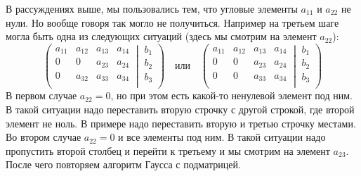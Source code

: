 В рассуждениях выше, мы пользовались тем, что угловые элементы $a_{11}$ и $a_{22}$ не нули.
Но вообще говоря так могло не получиться.
Например на третьем шаге могла быть одна из следующих ситуаций (здесь мы смотрим на элемент $a_{22}$):
\[
\left(\left.
\begin{matrix}
a_{11}& a_{12}&a_{13}& a_{14}\\
0&0&a_{23}& a_{24}\\
0& a_{32}&a_{33}& a_{34}\\
\end{matrix}
\:\right|\:
\begin{matrix}
b_1\\
b_2\\
b_3\\
\end{matrix}
\right)
\quad\text{или}\quad
\left(\left.
\begin{matrix}
a_{11}& a_{12}&a_{13}& a_{14}\\
0& 0&a_{23}& a_{24}\\
0& 0&a_{33}& a_{34}\\
\end{matrix}
\:\right|\:
\begin{matrix}
b_1\\
b_2\\
b_3\\
\end{matrix}
\right)
\]
В первом случае $a_{22} = 0$, но при этом есть какой-то ненулевой элемент под ним.
В такой ситуации надо переставить вторую строчку с другой строкой, где второй элемент не ноль.
В примере надо переставить вторую и третью строчку местами.
Во втором случае $a_{22} = 0$ и все элементы под ним.
В такой ситуации надо пропустить второй столбец и перейти к третьему и мы смотрим на элемент $a_{23}$.
После чего повторяем алгоритм Гаусса с подматрицей.

